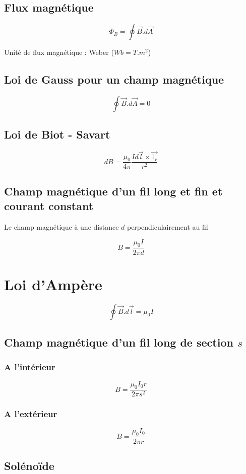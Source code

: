 \documentclass[a4paper,10pt,openright,titlepage]{report}
\begin{document}
\subsection{Flux magnétique}
$$\Phi_B = \oint \vec B.d \vec A$$

Unité de flux magnétique : Weber ($Wb = T.m^2$)

\subsection{Loi de Gauss pour un champ magnétique}

$$\oint \vec B . d\vec A = 0$$

\subsection{Loi de Biot - Savart}

$$dB = \frac{\mu_0}{4 \pi} \frac{I d \vec l \times \vec {1_r}}{r^2}$$

\subsection{Champ magnétique d'un fil long et fin et courant constant}

Le champ magnétique à une distance $d$ perpendiculairement au fil

$$B = \frac{\mu_0 I}{2 \pi d}$$

\section{Loi d'Ampère}

$$\oint \vec B . d \vec l = \mu_0 I$$

\subsection{Champ magnétique d'un fil long de section $s$}

\subsubsection{A l'intérieur}
$$B=\frac{\mu_0 I_0 r}{2 \pi s^2}$$

\subsubsection{A l'extérieur}
$$B=\frac{\mu_0 I_0}{2 \pi r}$$

\subsection{Solénoïde}
\end{document}
